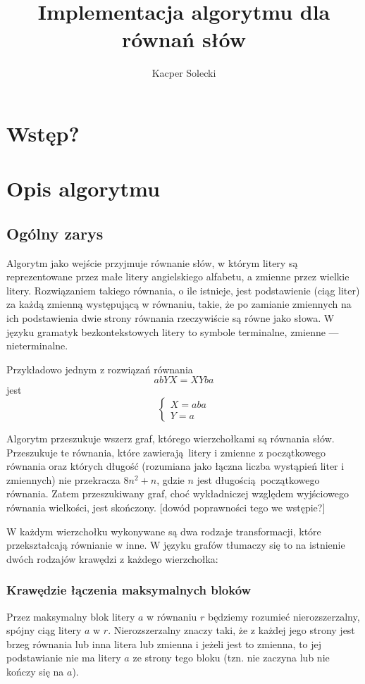 \documentclass[leqno, 12pt]{article}
\title{Implementacja algorytmu dla równań słów}
\author{Kacper Solecki}
\date{}
\begin{document}
\maketitle

\section{Wstęp?}
\section{Opis algorytmu}

\subsection{Ogólny zarys}
Algorytm jako wejście przyjmuje równanie słów, w którym litery są reprezentowane przez małe litery angielskiego alfabetu, a zmienne przez wielkie litery. Rozwiązaniem takiego równania, o ile istnieje,
jest podstawienie (ciąg liter) za każdą zmienną występującą w równaniu, takie, że po zamianie zmiennych na ich podstawienia dwie strony równania rzeczywiście są równe jako słowa. W języku gramatyk bezkontekstowych litery to symbole terminalne, zmienne --- nieterminalne. 


Przykładowo jednym z rozwiązań równania $$abYX = XYba$$ jest
$$
\begin{cases}
X = aba \\
Y = a
\end{cases}
$$

Algorytm przeszukuje wszerz graf, którego wierzchołkami są równania słów. 
Przeszukuje te równania, które zawierają litery i zmienne z początkowego równania oraz których długość (rozumiana jako łączna liczba wystąpień liter i zmiennych) nie przekracza $8n^2 + n$, gdzie $n$ jest długością początkowego równania. Zatem przeszukiwany graf, choć wykładniczej względem wyjściowego równania wielkości, jest skończony.
[dowód poprawności tego we wstępie?]


W każdym wierzchołku wykonywane są dwa rodzaje transformacji, które przekształcają równianie w inne. W języku grafów tłumaczy się to na istnienie dwóch rodzajów krawędzi z każdego wierzchołka:

\subsubsection*{Krawędzie łączenia maksymalnych bloków}
Przez maksymalny blok litery $a$ w równaniu $r$ będziemy rozumieć nierozszerzalny, spójny ciąg litery $a$ w $r$. Nierozszerzalny znaczy taki, że z każdej jego strony jest brzeg równania lub inna litera lub zmienna i jeżeli jest to zmienna, to jej podstawianie nie ma litery $a$ ze strony tego bloku (tzn. nie zaczyna lub nie kończy się na $a$).
\end{document}
